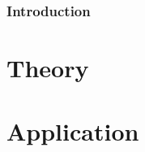 \documentclass[12pt,draft,letterpaper]{report}
\begin{document}
\newpage



\section*{Introduction}
\part{Theory\label{part:one}}%
\part{Application\label{part:two}}%


\newpage

\singlespacing
\appendix



%
%



\end{document}
